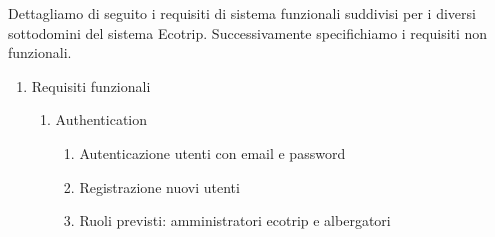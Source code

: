 Dettagliamo di seguito i requisiti di sistema funzionali suddivisi per i diversi sottodomini del sistema Ecotrip.
Successivamente specifichiamo i requisiti non funzionali.

\renewcommand{\theenumi}{\arabic{enumi}}
\renewcommand{\labelenumi}{\theenumi}
\renewcommand{\theenumii}{\theenumi.\arabic{enumii}}
\renewcommand{\labelenumii}{\theenumii}
\renewcommand{\theenumiii}{\theenumii.\arabic{enumiii}}
\renewcommand{\labelenumiii}{\theenumiii}
\renewcommand{\theenumiv}{\theenumiii.\arabic{enumiv}}
\renewcommand{\labelenumiv}{\theenumiv}

\begin{enumerate}
    \item Requisiti funzionali

    \begin{enumerate}
        \item Authentication
        \begin{enumerate}
            \item Autenticazione utenti con email e password
            \item Registrazione nuovi utenti
            \item Ruoli previsti: amministratori ecotrip e albergatori
        \end{enumerate}
    \end{enumerate}


\end{enumerate}
